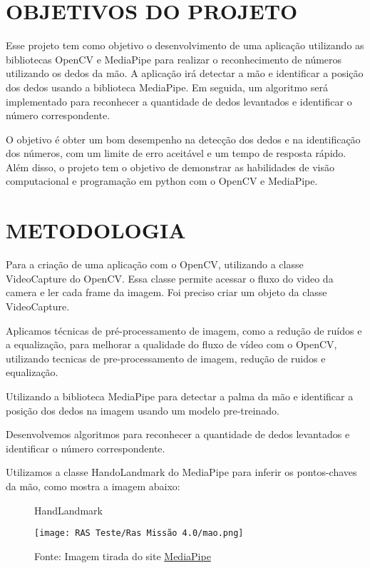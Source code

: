 \documentclass[12pt,a4paper]{article}
\begin{document}
    \newpage

    \section{OBJETIVOS DO PROJETO}

        Esse projeto tem como objetivo o desenvolvimento de uma aplicação utilizando as bibliotecas OpenCV e MediaPipe para realizar o reconhecimento de números utilizando os dedos da mão. A aplicação irá detectar a mão e identificar a posição dos dedos usando a biblioteca MediaPipe. Em seguida, um algoritmo será implementado para reconhecer a quantidade de dedos levantados e identificar o número correspondente.

        O objetivo é obter um bom desempenho na detecção dos dedos e na identificação dos números, com um limite de erro aceitável e um tempo de resposta rápido. Além disso, o projeto tem o objetivo de demonstrar as habilidades de visão computacional e programação em python com o OpenCV e MediaPipe.

    \newpage

    \section{METODOLOGIA}

        Para a criação de uma aplicação com o OpenCV, utilizando a classe VideoCapture do OpenCV. Essa classe permite acessar o fluxo do video da camera e ler cada frame da imagem. Foi preciso criar um objeto da classe VideoCapture.

        Aplicamos técnicas de pré-processamento de imagem, como a redução de ruídos e a equalização, para melhorar a qualidade do fluxo de vídeo com o OpenCV, utilizando tecnicas de pre-processamento de imagem, redução de ruidos e equalização.

        Utilizando a biblioteca MediaPipe para detectar a palma da mão e identificar a posição dos dedos na imagem usando um modelo pre-treinado.

        Desenvolvemos algoritmos para reconhecer a quantidade de dedos levantados e identificar o número correspondente.

        Utilizamos a classe HandoLandmark do MediaPipe para inferir os pontos-chaves da mão, como mostra a imagem abaixo:

        \begin{figure}[!h]
            \centering
            \caption{HandLandmark}
            \texttt{[image: RAS Teste/Ras Missão 4.0/mao.png]}
            \caption*{Fonte: Imagem tirada do site \href{https://developers.google.com/mediapipe/solutions/vision/hand_landmarker}{MediaPipe}}
            \label{fig:my_label}
        \end{figure}
\end{document}
